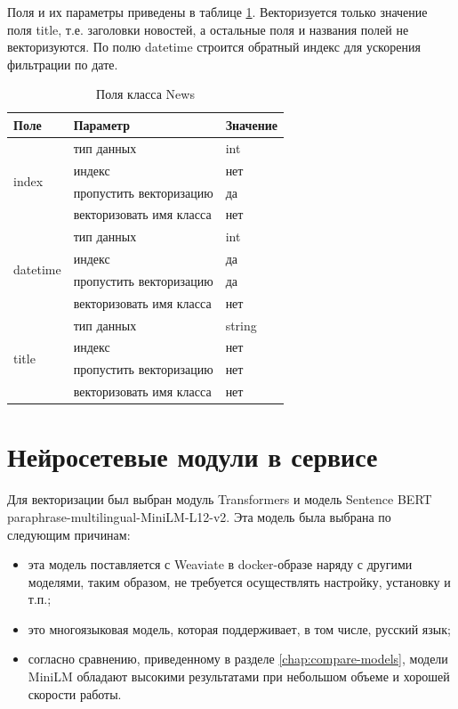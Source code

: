 Поля и их параметры приведены в таблице \ref{tab:class-news-props}. Векторизуется только значение поля title, т.е. заголовки новостей, а остальные поля и названия полей не векторизуются. По полю datetime строится обратный индекс для ускорения фильтрации по дате.

\begin{table}[ht]
    \caption{Поля класса News}
    \label{tab:class-news-props}
    \begin{tabularx}{\textwidth}{|l|X|X|}
        \hline
        Поле & Параметр & Значение \\
        \hline
        \multirow{4}{*}{index} & тип данных & int \\
            \cline{2-3}
            & индекс & нет \\
            \cline{2-3}
            & пропустить векторизацию & да \\
            \cline{2-3}
            & векторизовать имя класса & нет \\
        \hline
        \multirow{4}{*}{datetime} & тип данных & int \\
            \cline{2-3}
            & индекс & да \\
            \cline{2-3}
            & пропустить векторизацию & да \\
            \cline{2-3}
            & векторизовать имя класса & нет \\
        \hline
        \multirow{4}{*}{title} & тип данных & string \\
            \cline{2-3}
            & индекс & нет \\
            \cline{2-3}
            & пропустить векторизацию & нет \\
            \cline{2-3}
            & векторизовать имя класса & нет \\
        \hline
    \end{tabularx}
\end{table}

\section{Нейросетевые модули в сервисе}

Для векторизации был выбран модуль Transformers и модель Sentence BERT paraphrase-multilingual-MiniLM-L12-v2. Эта модель была выбрана по следующим причинам:
\begin{itemize}
    \item эта модель поставляется с Weaviate в docker-образе наряду с другими моделями, таким образом, не требуется осуществлять настройку, установку и т.п.;
    \item это многоязыковая модель, которая поддерживает, в том числе, русский язык;
    \item согласно сравнению, приведенному в разделе \ref{chap:compare-models}, модели MiniLM обладают высокими результатами при небольшом объеме и хорошей скорости работы.
\end{itemize}

